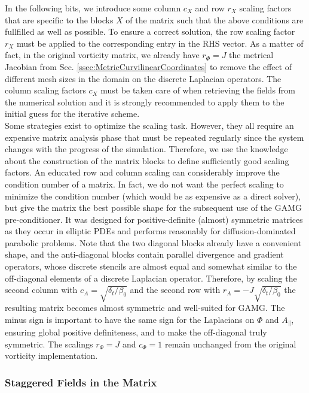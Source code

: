 In the following bits, we introduce some column $c_X$ and row $r_X$ scaling factors that are specific to the blocks $X$ of the matrix such that the above conditions are fullfilled as well as possible. To ensure a correct solution, the row scaling factor $r_X$ must be applied to the corresponding entry in the RHS vector. As a matter of fact, in the original vorticity matrix, we already have $r_\Phi = J$ the metrical Jacobian from Sec. \ref{ssec:MetricCurvilinearCoordinates} to remove the effect of different mesh sizes in the domain on the discrete Laplacian operators. The column scaling factors $c_X$ must be taken care of when retrieving the fields from the numerical solution and it is strongly recommended to apply them to the initial guess for the iterative scheme. \\ 

Some strategies exist to optimize the scaling task\cite{sinkhorn1967concerning,parlett1969balancing}. However, they all require an expensive matrix analysis phase that must be repeated regularly since the system changes with the progress of the simulation. Therefore, we use the knowledge about the construction of the matrix blocks to define sufficiently good scaling factors. An educated row and column scaling can considerably improve the condition number of a matrix\cite{van1969condition}. In fact, we do not want the perfect scaling to minimize the condition number (which would be as expensive as a direct solver), but give the matrix the best possible shape for the subsequent use of the GAMG pre-conditioner. It was designed for positive-definite (almost) symmetric matrices\cite{brandt1984algebraic} as they occur in elliptic PDEs and performs reasonably for diffusion-dominated parabolic problems. Note that the two diagonal blocks already have a convenient shape, and the anti-diagonal blocks contain parallel divergence and gradient operators, whose discrete stencils are almost equal and somewhat similar to the off-diagonal elements of a discrete Laplacian operator. Therefore, by scaling the second column with $c_A = \sqrt{\delta_t / \beta_0}$ and the second row with $r_A = -J\sqrt{\delta_t / \beta_0}$ the resulting matrix becomes almost symmetric and well-suited for GAMG. The minus sign is important to have the same sign for the Laplacians on $\Phi$ and $A_\parallel$, ensuring global positive definiteness, and to make the off-diagonal truly symmetric. The scalings $r_\Phi = J$ and $c_\Phi = 1$ remain unchanged from the original vorticity implementation.


\subsubsection{Staggered Fields in the Matrix}
\label{ssec:StaggeredFieldsMatrix}


